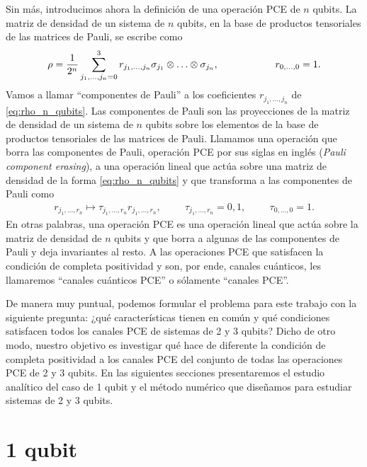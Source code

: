 Sin más, introducimos ahora la definición de una operación PCE de 
$n$ qubits. La matriz de densidad de un sistema de $n$ qubits, en la base de
productos tensoriales de las matrices de Pauli, se escribe como
\begin{align}\label{eq:rho_n_qubits}
\rho=\frac{1}{2^n}\sum_{j_1,\ldots,j_n=0}^3
r_{j_1,\ldots,j_n}\sigma_{j_1}\otimes\ldots\otimes\sigma_{j_n},
\hspace{2cm} r_{0,\ldots,0}=1.
\end{align}
Vamos a llamar ``componentes de Pauli'' a los coeficientes $r_{j_1,\ldots,j_n}$
de \eqref{eq:rho_n_qubits}. Las componentes de Pauli son las proyecciones
de la matriz de densidad de un sistema de $n$ qubits sobre los elementos
de la base de productos tensoriales de las matrices de Pauli.
Llamamos una operación que borra las componentes de Pauli, 
operación PCE por sus siglas en inglés (\textit{Pauli
component erasing}), a una operación lineal que actúa sobre una 
matriz de densidad de la forma \eqref{eq:rho_n_qubits} y 
que transforma a las componentes de Pauli como
\begin{align}\label{eq:PCE_definition}
r_{j_1,\ldots,r_n}\longmapsto \tau_{j_1,\ldots,r_n}r_{j_1,\ldots,r_n},
\hspace{1cm} \tau_{j_1,\ldots,r_n} = 0,1,
\hspace{1cm} \tau_{0,\ldots,0}=1.
\end{align}
En otras palabras, una operación PCE es una operación lineal que actúa sobre la
matriz de densidad de $n$ qubits y que borra a algunas de las componentes de
Pauli y deja invariantes al resto.
A las operaciones PCE que satisfacen 
la condición de completa positividad y son, por ende, canales cuánticos,
les llamaremos ``canales cuánticos PCE'' o sólamente ``canales PCE''.

De manera muy puntual, podemos formular el problema para 
este trabajo con la siguiente pregunta: ¿qué características tienen 
en común y qué condiciones satisfacen todos los canales PCE 
de sistemas de 2 y 3 qubits? Dicho de otro modo, 
nuestro objetivo es investigar qué hace de diferente la condición de 
completa positividad a los canales PCE del conjunto de todas las 
operaciones PCE de 2 y 3 qubits.
En las siguientes secciones presentaremos el estudio analítico del 
caso de 1 qubit y el método numérico que diseñamos 
para estudiar sistemas de 2 y 3 qubits. 


\section{1 qubit} %
%

